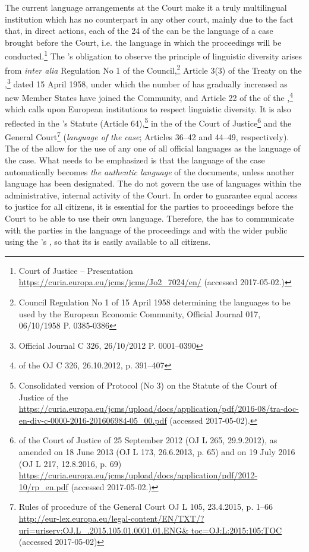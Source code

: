 \documentclass[output=paper]{langsci/langscibook}
\begin{document}
The current language arrangements at the Court make it a truly multilingual institution which has no counterpart in any other court, mainly due to the fact that, in direct actions, each of the 24  of the  can be the language of a case brought before the Court, i.e. the language in which the proceedings will be conducted.\footnote{Court of Justice – Presentation \url{https://curia.europa.eu/jcms/jcms/Jo2_7024/en/}  (accessed 2017-05-02.)} The ’s obligation to observe the principle of linguistic diversity arises from \textit{inter alia} Regulation No 1 of the Council,\footnote{Council Regulation No 1 of 15 April 1958 determining the languages to be used by the European Economic Community, Official Journal 017, 06/10/1958 P. 0385-0386} Article 3(3) of the Treaty on the ,\footnote{Official Journal C 326, 26/10/2012 P. 0001–0390} dated 15 April 1958, under which the number of  has gradually increased as new Member States have joined the Community, and Article 22 of the  of the ,\footnote{ of the  OJ C 326, 26.10.2012, p. 391–407} which calls upon European institutions to respect linguistic diversity. It is also reflected in the ’s Statute (Article 64),\footnote{Consolidated version of Protocol (No 3) on the Statute of the Court of Justice of the  \url{https://curia.europa.eu/jcms/upload/docs/application/pdf/2016-08/tra-doc-en-div-c-0000-2016-201606984-05_00.pdf} (accessed 2017-05-02).} in the  of the Court of Justice\footnote{ of the Court of Justice of 25 September 2012 (OJ L 265, 29.9.2012), as amended on 18 June 2013 (OJ L 173, 26.6.2013, p. 65) and on 19 July 2016 (OJ L 217, 12.8.2016, p. 69) \url{https://curia.europa.eu/jcms/upload/docs/application/pdf/2012-10/rp_en.pdf} (accessed 2017-05-02.)} and the General Court\footnote{Rules of procedure of the General Court OJ L 105, 23.4.2015, p. 1–66 \url{http://eur-lex.europa.eu/legal-content/EN/TXT/?uri=uriserv:OJ.L_.2015.105.01.0001.01.ENG& toc=OJ:L:2015:105:TOC} (accessed 2017-05-02)} (\textit{language of the case}; Articles 36–42 and 44–49, respectively). The  of the  allow for the use of any one of all official  languages as the language of the case. What needs to be emphasized is that the language of the case automatically becomes \textit{the} \textit{authentic language} of the documents, unless another language has been designated. The  do not govern the use of languages within the administrative, internal activity of the Court. In order to guarantee equal access to justice for all citizens, it is essential for the parties to proceedings before the Court to be able to use their own language. Therefore, the  has to communicate with the parties in the language of the proceedings and with the wider public using the ’s , so that its  is easily available to all  citizens.
\end{document}
